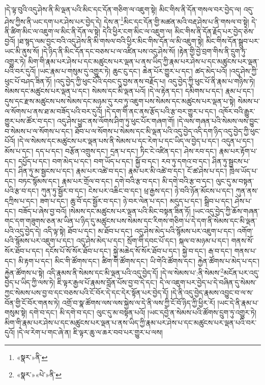 །དེ་ལྟ་བུའི་འདུ་ཤེས་ནི་མི་ལྡན་པའི་མིང་དང་དོན་གཅིག་ལ་འཇུག་སྟེ། མིང་གིས་ནི་དོན་གསལ་བར་བྱེད་ལ། འདུ་ཤེས་ཀྱིས་ནི་ཡང་དག་པར་ཤེས་པར་བྱེད་དེ། དེས་ན་\footnote{«སྣར་»ནི་}མིང་དང་དོན་གྱི་མཚན་མའི་བརྡ་ཤེས་པ་ནི་གསལ་བ་སྟེ། དེ་ནི་ཚིག་མིང་ལ་འཇུག་ལ་མིང་ནི་དོན་ལ་སྟེ། དེའི་ཕྱིར་ངག་མིང་ལ་འཇུག་ལ། མིང་གིས་ནི་དོན་རྗོད་པར་བྱེད་ཅེས་བྱའོ། །ཐ་སྙད་ལམ་བྱང་བའི་འདུ་ཤེས་ནི་མི་གསལ་བའི་ཕྱིར་མིང་གིས་དོན་ལ་མི་འཇུག་སྟེ། མིང་གིས་དོན་སྒྲུབ་པར་ཡང་མི་ནུས་སོ། །དེ་ཉིད་ནི་མིང་དོན་དང་བཅས་པ་ལ་འཛིན་པས་འདུ་ཤེས་སོ། །རྟེན་གྱི་བྱེ་བྲག་གིས་ནི་དྲུག་ཏུ་འགྱུར་ཏེ། མིག་གི་རྣམ་པར་ཤེས་པ་དང་མཚུངས་པར་ལྡན་པ་ནས་ཡིད་ཀྱི་རྣམ་པར་ཤེས་པ་དང་མཚུངས་པར་ལྡན་པའི་བར་དུའོ། །ཡང་རྣམ་པ་གསུམ་དུ་འགྱུར་ཏེ། ཆུང་ངུ་དང་། ཆེན་པོར་གྱུར་པ་དང་། ཚད་མེད་པའོ། །འདུ་ཤེས་ཀྱི་ཕུང་པོ་བཤད་ཟིན་ཏོ། །འདུ་བྱེད་ཀྱི་ཕུང་པོའི་དབང་དུ་བྱས་ནས་བརྗོད་པ། འདུ་བྱེད་ཀྱི་ཕུང་པོ་ནི་རྣམ་པ་གཉིས་ཏེ། སེམས་དང་མཚུངས་པར་ལྡན་པ་དང་། སེམས་དང་མི་ལྡན་པའོ། །དེ་ལ་རྟེན་དང་། དམིགས་པ་དང་། རྣམ་པ་དང་། དུས་དང་རྫས་མཚུངས་པས་སེམས་དང་མཉམ་དུ་རབ་ཏུ་འཇུག་པས་སེམས་དང་མཚུངས་པར་ལྡན་པ་སྟེ། སེམས་པ་ལ་སོགས་པ་ནས་ཐ་མ་བཟོད་པའི་བར་དུའོ། །དེ་དག་གི་ནང་ནས་རྩོད་པའི་རྩ་བར་གྱུར་པ་དང་། འཁོར་བའི་རྒྱུར་གྱུར་པས་ཚོར་བ་དང་། འདུ་ཤེས་ཕྱུང་ནས་ལོགས་ཤིག་ཏུ་ཕུང་པོར་གཞག་གོ། །དེ་ལས་གཞན་པའི་སེམས་ལས་བྱུང་བ་སེམས་པ་ལ་སོགས་པ་དང་། ཐོབ་པ་ལ་སོགས་པ་སེམས་དང་མི་ལྡན་པའི་འདུ་བྱེད་འདི་དག་ཉིད་འདུ་བྱེད་ཀྱི་ཕུང་པོའོ། །དེ་ལ་སེམས་དང་མཚུངས་པར་ལྡན་པས་ནི་སེམས་པ་དང་རེག་པ་དང་ཡིད་ལ་བྱེད་པ་དང་། འདུན་པ་དང་། མོས་པ་དང་། དད་པ་དང་། བརྩོན་འགྲུས་དང་། དྲན་པ་དང་། ཏིང་ངེ་འཛིན་དང་། ཤེས་རབ་དང་། རྣམ་པར་རྟོག་པ་དང་། དཔྱོད་པ་དང་། བག་མེད་པ་དང་། བག་ཡོད་པ་དང་། སྐྱོ་བ་དང་། རབ་ཏུ་དགའ་བ་དང་། ཤིན་ཏུ་སྦྱངས་པ་དང་། ཤིན་ཏུ་མ་སྦྱངས་པ་དང་། རྣམ་པར་འཚེ་བ་དང་། རྣམ་པར་མི་འཚེ་བ་དང་། ངོ་ཚ་ཤེས་པ་དང་། ཁྲེལ་ཡོད་པ་དང་། བཏང་སྙོམས་དང་། རྣམ་པར་གྲོལ་བ་དང་། དགེ་བའི་རྩ་བ་དང་། མི་དགེ་བའི་རྩ་བ་དང་། ལུང་དུ་མ་བསྟན་པའི་རྩ་བ་དང་། ཀུན་ཏུ་སྦྱོར་བ་དང་། ངེས་པར་འཆིང་བ་དང་། ཕྲ་རྒྱས་དང་། ཉེ་བའི་ཉོན་མོངས་པ་དང་། ཀུན་ནས་དཀྲིས་པ་དང་། ཟག་པ་དང་། ཆུ་བོ་དང་སྦྱོར་བ་དང་། ཉེ་བར་ལེན་པ་དང་། མདུད་པ་དང་། སྒྲིབ་པ་དང་། ཤེས་པ་དང་། བཟོད་པ་ཞེས་བྱ་བའོ། །སེམས་དང་མཚུངས་པར་ལྡན་པའི་མིང་བསྟན་ཟིན་ཏོ། །ཡང་འདུ་བྱེད་ཀྱི་ཆོས་གཞན་གང་དག་གཟུགས་ཅན་མ་ཡིན་པ་ཉིད་དུ་མཚུངས་པས་སེམས་དང་རིགས་གཅིག་པ་དེ་དག་ནི་སེམས་དང་མི་ལྡན་པའི་འདུ་བྱེད་དེ། འདི་ལྟ་སྟེ། ཐོབ་པ་དང་། མ་ཐོབ་པ་དང་། འདུ་ཤེས་མེད་པའི་སྙོམས་པར་འཇུག་པ་དང་། འགོག་པའི་སྙོམས་པར་འཇུག་པ་དང་། འདུ་ཤེས་མེད་པ་དང་། སྲོག་གི་དབང་པོ་དང་། སྐལ་བ་མཉམ་པ་དང་། གནས་སོ་སོར་ཐོབ་པ་དང་། དངོས་པོ་སོ་སོར་ཐོབ་པ་དང་། སྐྱེ་མཆེད་སོ་སོར་ཐོབ་པ་དང་། སྐྱེ་བ་དང་། རྒ་བ་དང་། གནས་པ་དང་། མི་རྟག་པ་དང་། མིང་གི་ཚོགས་དང་། ཚིག་གི་ཚོགས་དང་། ཡི་གེའི་ཚོགས་དང་། རྐྱེན་ཚོགས་པ་མེད་པ་དང་། རྐྱེན་ཚོགས་པ་སྟེ། འདི་རྣམས་ནི་སེམས་དང་མི་ལྡན་པའི་འདུ་བྱེད་དོ། །དེ་ལ་སེམས་པ་:ནི་སེམས་\footnote{«སྣར་»«པེ་»ནི་}མངོན་པར་འདུ་བྱེད་པ་ཡིད་ཀྱི་ལས་ཏེ། ཇི་ལྟར་རྒྱལ་པོ་རྣམས་བློན་པོས་བྱ་བ་དེ་དང་། དེ་ལ་འཇུག་པར་བྱེད་པ་དེ་བཞིན་དུ་སེམས་ཀྱང་སེམས་པས་བྱ་བ་དང་བཅས་པའི་ངོ་བོར་དེ་དང་དེར་སྟོན་པར་བྱེད་དོ། །དེ་ནི་འདུ་བྱེད་རྣམས་འབྱུང་བ་ལ་ས་བོན་གྱི་ངོ་བོར་གནས་ཏེ། འགྲོ་བ་སྣ་ཚོགས་ལས་ལས་སྐྱེས་ལ་དེ་ནི་ལས་ཀྱི་ངོ་བོ་ཉིད་ཀྱི་ཕྱིར་རོ། །ཡང་དེ་ནི་རྣམ་པ་གསུམ་སྟེ། དགེ་བ་དང་། མི་དགེ་བ་དང་། ལུང་དུ་མ་བསྟན་པའོ། །ཡང་དབྱེ་ན་སེམས་པའི་ཚོགས་དྲུག་ཏུ་འགྱུར་ཏེ། མིག་གི་རྣམ་པར་ཤེས་པ་དང་མཚུངས་པར་ལྡན་པ་ནས་ཡིད་ཀྱི་རྣམ་པར་ཤེས་པ་དང་མཚུངས་པར་ལྡན་པའི་བར་དུའོ། །དེ་ལ་རེག་པ་གང་ཞེ་ན། ཇི་ལྟར་ཆུ་ལ་ཆར་བབ་པར་གྱུར་པ་ལས། 